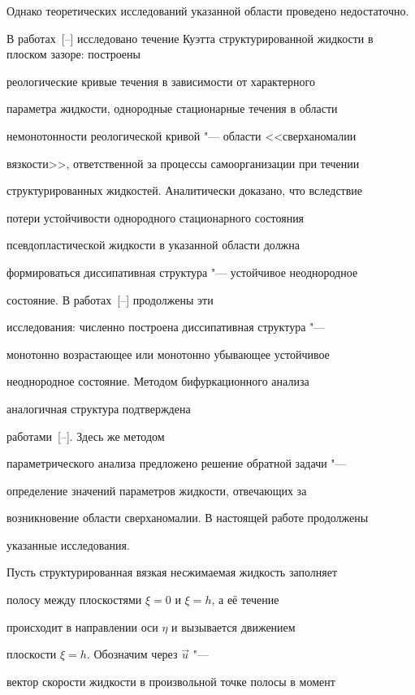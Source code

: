 Однако теоретических исследований указанной области проведено недостаточно.



В работах~[--] исследовано течение Куэтта структурированной жидкости в плоском зазоре: построены

реологические кривые течения в зависимости от характерного

параметра жидкости, однородные стационарные течения  в области

немонотонности реологической кривой "--- области <<сверх\-ано\-ма\-лии

вязкости>>, ответственной за процессы самоорганизации при течении

структурированных жидкостей. Аналитически доказано, что вследствие

потери устойчивости однородного стационарного состояния

псевдопластической жидкости в указанной области должна

формироваться диссипативная структура "--- устойчивое неоднородное

состояние. В работах~[--] продолжены эти

исследования: численно построена диссипативная структура "---

монотонно  возрастающее или монотонно убывающее устойчивое

неоднородное состояние. Методом бифуркационного анализа

аналогичная структура подтверждена

работами~[--]. Здесь же методом

параметрического анализа предложено решение обратной задачи "---

определение значений параметров жидкости, отвечающих за

возникновение области сверх\-ано\-ма\-лии. В настоящей работе продолжены

указанные исследования.



Пусть структурированная вязкая несжимаемая жидкость заполняет

полосу между плоскостями $\xi =0$ и $\xi =h$, а её течение

происходит в направлении оси $\eta$ и вызывается движением

плоскости $\xi =h$. Обозначим через $\overrightarrow{u}$ "---

вектор скорости жидкости в произвольной точке полосы в момент


